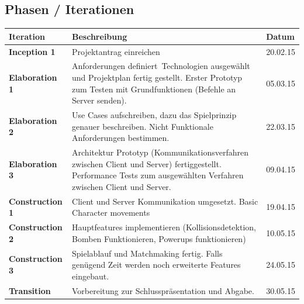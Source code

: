 \documentclass[11pt]{scrartcl}
\begin{document}
\subsection{Phasen / Iterationen}
\label{sec:Phasen / Iterationen}

\begin{table}[h]
\begin{tabularx}{\textwidth}{l X l}
\textbf{Iteration} & \textbf{Beschreibung} & \textbf{Datum} \\
\hline
\textbf{Inception 1} & Projektantrag einreichen & 20.02.15 \\
\hline
\textbf{Elaboration 1} & Anforderungen definiert\, Technologien ausgewählt 
und Projektplan fertig gestellt. Erster Prototyp zum Testen mit Grundfunktionen (Befehle an Server senden). & 05.03.15 \\
\hline
\textbf{Elaboration 2} & Use Cases aufschreiben, dazu das Spielprinzip genauer beschreiben. 
Nicht Funktionale Anforderungen bestimmen. & 22.03.15 \\
\hline
\textbf{Elaboration 3} & Architektur Prototyp (Kommunikationsverfahren 
zwischen Client und Server) fertiggestellt. 
Performance Tests zum ausgewählten Verfahren zwischen Client und Server. & 09.04.15 \\
\hline
\textbf{Construction 1} & Client und Server Kommunikation umgesetzt.
Basic Character movements & 19.04.15 \\
\hline
\textbf{Construction 2} & Hauptfeatures implementieren
 (Kollisionsdetektion, Bomben Funktionieren, Powerups funktionieren) & 10.05.15 \\
\hline
\textbf{Construction 3} & Spielablauf und Matchmaking fertig. Falls genügend Zeit werden
 noch erweiterte Features eingebaut. & 24.05.15 \\
\hline
\textbf{Transition} & Vorbereitung zur Schlusspräsentation 
und Abgabe. & 30.05.15 \\
\hline
\end{tabularx}
\end{table}
\end{document}
